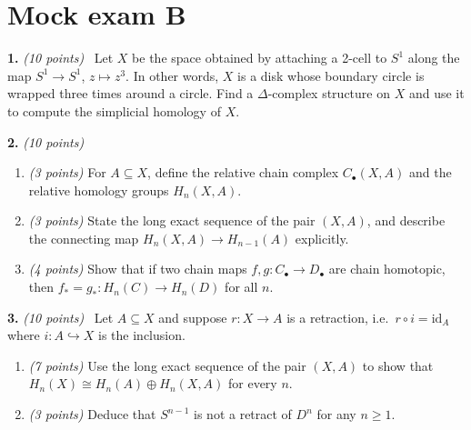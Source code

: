 \documentclass[11pt]{article}
\newcommand{\prob}[2]{\par\medskip\textbf{#1.} \textit{(#2 points)}\ }
\begin{document}
\section*{Mock exam B}
\begin{exambox}
\prob{1}{10} Let $X$ be the space obtained by attaching a 2-cell to $S^1$ along the map $S^1\to S^1$, $z\mapsto z^3$. In other words, $X$ is a disk whose boundary circle is wrapped three times around a circle. Find a $\Delta$-complex structure on $X$ and use it to compute the simplicial homology of $X$.

\prob{2}{10}
\begin{enumerate}[label=(\alph*),leftmargin=*]
\item \textit{(3 points)} For $A\subseteq X$, define the relative chain complex $C_\bullet(X,A)$ and the relative homology groups $H_n(X,A)$.
\item \textit{(3 points)} State the long exact sequence of the pair $(X,A)$, and describe the connecting map $H_n(X,A)\to H_{n-1}(A)$ explicitly.
\item \textit{(4 points)} Show that if two chain maps $f,g:C_\bullet\to D_\bullet$ are chain homotopic, then $f_*=g_*:H_n(C)\to H_n(D)$ for all $n$.
\end{enumerate}

\prob{3}{10} Let $A\subseteq X$ and suppose $r:X\to A$ is a retraction, i.e.\ $r\circ i=\mathrm{id}_A$ where $i:A\hookrightarrow X$ is the inclusion.
\begin{enumerate}[label=(\alph*),leftmargin=*]
\item \textit{(7 points)} Use the long exact sequence of the pair $(X,A)$ to show that $H_n(X)\cong H_n(A)\oplus H_n(X,A)$ for every $n$.
\item \textit{(3 points)} Deduce that $S^{n-1}$ is not a retract of $D^n$ for any $n\ge1$.
\end{enumerate}
\end{exambox}

\end{document}
